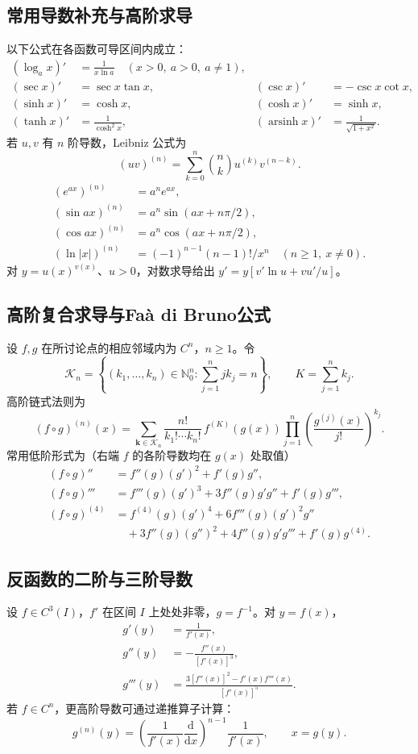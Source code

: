 \documentclass[../main.tex]{subfiles}
\begin{document}
\subsection{常用导数补充与高阶求导}
以下公式在各函数可导区间内成立：
\begin{align*}
(\log_a x)'&=\frac1{x\ln a}\quad(x>0,\ a>0,\ a\ne1),\\
(\sec x)'&=\sec x\tan x, &(\csc x)'&=-\csc x\cot x,\\
(\sinh x)'&=\cosh x, &(\cosh x)'&=\sinh x,\\
(\tanh x)'&=\frac1{\cosh^2x},
 &(\operatorname{arsinh}x)'&=\frac1{\sqrt{1+x^2}}.
\end{align*}
若 $u,v$ 有 $n$ 阶导数，Leibniz 公式为
\[
(uv)^{(n)}=\sum_{k=0}^n\binom nk u^{(k)}v^{(n-k)}.
\]
\begin{align*}
(e^{ax})^{(n)}&=a^ne^{ax},\\
(\sin ax)^{(n)}&=a^n\sin(ax+n\pi/2),\\
(\cos ax)^{(n)}&=a^n\cos(ax+n\pi/2),\\
(\ln|x|)^{(n)}&=(-1)^{n-1}(n-1)!/x^n\quad(n\ge1,\ x\ne0).
\end{align*}
对 $y=u(x)^{v(x)}$、$u>0$，对数求导给出 $y'=y[v'\ln u+vu'/u]$。
\subsection{高阶复合求导与Fa\`a di Bruno公式}
设 $f,g$ 在所讨论点的相应邻域内为 $C^n$，$n\ge1$。令
\[
\mathcal K_n=\left\{(k_1,\ldots,k_n)\in\mathbb N_0^n:
\sum_{j=1}^njk_j=n\right\},\qquad K=\sum_{j=1}^nk_j.
\]
高阶链式法则为
\[
(f\circ g)^{(n)}(x)=
\sum_{\bm k\in\mathcal K_n}
\frac{n!}{k_1!\cdots k_n!}\,f^{(K)}(g(x))
\prod_{j=1}^n\left(\frac{g^{(j)}(x)}{j!}\right)^{k_j}.
\]
常用低阶形式为（右端 $f$ 的各阶导数均在 $g(x)$ 处取值）
\begin{align*}
(f\circ g)''&=f''(g)(g')^2+f'(g)g'',\\
(f\circ g)'''&=f'''(g)(g')^3+3f''(g)g'g''+f'(g)g''',\\
(f\circ g)^{(4)}&=f^{(4)}(g)(g')^4+6f'''(g)(g')^2g''\\
&\quad+3f''(g)(g'')^2+4f''(g)g'g'''+f'(g)g^{(4)}.
\end{align*}
\subsection{反函数的二阶与三阶导数}
设 $f\in C^3(I)$，$f'$ 在区间 $I$ 上处处非零，$g=f^{-1}$。对 $y=f(x)$，
\begin{align*}
g'(y)&=\frac1{f'(x)},\\
g''(y)&=-\frac{f''(x)}{[f'(x)]^3},\\
g'''(y)&=\frac{3[f''(x)]^2-f'(x)f'''(x)}{[f'(x)]^5}.
\end{align*}
若 $f\in C^n$，更高阶导数可通过递推算子计算：
\[
g^{(n)}(y)=
\left(\frac1{f'(x)}\frac{\mathrm d}{\mathrm dx}\right)^{n-1}
\frac1{f'(x)},\qquad x=g(y).
\]
\end{document}
